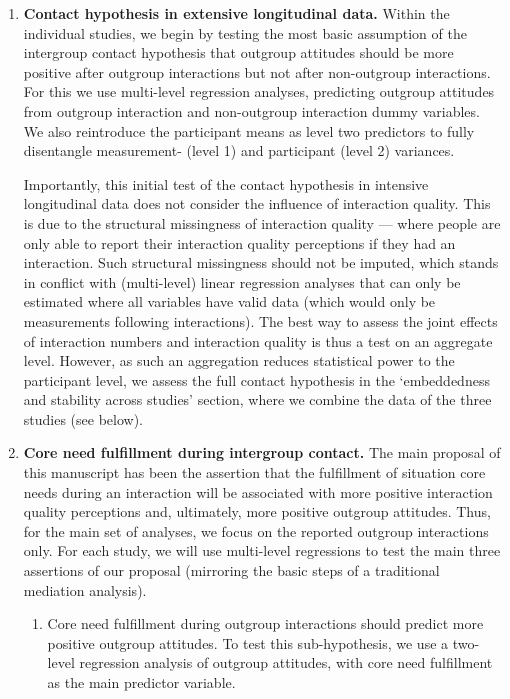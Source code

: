 \documentclass[man, 12pt, a4paper, mask]{apa7}
\theoremstyle{break}
\theoremstyle{plain}
\begin{document}
\begin{enumerate}
    \item \textbf{Contact hypothesis in extensive longitudinal data.} Within the individual studies, we begin by testing the most basic assumption of the intergroup contact hypothesis that outgroup attitudes should be more positive after outgroup interactions but not after non-outgroup interactions. For this we use multi-level regression analyses, predicting outgroup attitudes from outgroup interaction and non-outgroup interaction dummy variables. We also reintroduce the participant means as level two predictors to fully disentangle measurement- (level 1) and participant (level 2) variances.
    
    Importantly, this initial test of the contact hypothesis in intensive longitudinal data does not consider the influence of interaction quality. This is due to the structural missingness of interaction quality --- where people are only able to report their interaction quality perceptions if they had an interaction. Such structural missingness should not be imputed, which stands in conflict with (multi-level) linear regression analyses that can only be estimated where all variables have valid data (which would only be measurements following interactions). The best way to assess the joint effects of interaction numbers and interaction quality is thus a test on an aggregate level. However, as such an aggregation reduces statistical power to the participant level, we assess the full contact hypothesis in the `embeddedness and stability across studies' section, where we combine the data of the three studies (see below).
    \item \textbf{Core need fulfillment during intergroup contact.} The main proposal of this manuscript has been the assertion that the fulfillment of situation core needs during an interaction will be associated with more positive interaction quality perceptions and, ultimately, more positive outgroup attitudes. Thus, for the main set of analyses, we focus on the reported outgroup interactions only. For each study, we will use multi-level regressions to test the main three assertions of our proposal (mirroring the basic steps of a traditional mediation analysis).
    \begin{enumerate}
        \item Core need fulfillment during outgroup interactions should predict more positive outgroup attitudes. To test this sub-hypothesis, we use a two-level regression analysis of outgroup attitudes, with core need fulfillment as the main predictor variable.

\end{enumerate}
\end{enumerate}
\end{document}
